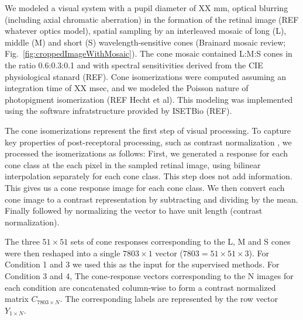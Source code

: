 \documentclass{jov}
\begin{document}
We modeled a visual system with a pupil diameter of XX mm, optical blurring (including axial chromatic aberration) in the formation of the retinal image (REF whatever optics model), spatial sampling by an interleaved mosaic of long (L), middle (M)  and short (S) wavelength-sensitive cones (Brainard mosaic review; Fig.~\ref{fig:croppedImageWithMosaic}). The cone mosaic contained  L:M:S cones in the ratio 0.6:0.3:0.1 and with spectral sensitivities derived from the CIE physiological stanard (REF).
Cone isomerizations were computed assuming an integration time of XX msec, and we modeled the Poisson nature of photopigment isomerization (REF Hecht et al). This modeling was implemented using the software infratstructure provided by ISETBio (REF).

The cone isomerizations represent the first step of visual processing.
To capture key properties of post-receptoral processing, such as contrast normalization \cite{heeger1992normalization,albrecht1991motion,carandini2012normalization},
we processed the isomerizations as follows:
First, we generated a response for each cone class at the each pixel in the sampled retinal image, using bilinear interpolation separately for each cone class.
This step does not add information.
This gives us a cone response image for each cone class.
We then convert each cone image to a contrast representation by subtracting and dividing by the mean.
Finally  followed by normalizing the vector to have unit length (contrast normalization).


The three $51 \times 51$ sets of cone responses corresponding to the L, M and S cones were then reshaped into a single $7803 \times 1$ vector ($7803 = 51 \times 51 \times 3$). For Condition 1 and 3 we used this as the input for the supervised methods. For Condition 3 and 4, 
The cone-response vectors corresponding to the N images for each condition are concatenated column-wise to form a contrast normalized matrix $C_{7803\times N}$. The corresponding labels are represented by the row vector $Y_{1\times N}$.


\end{document}
